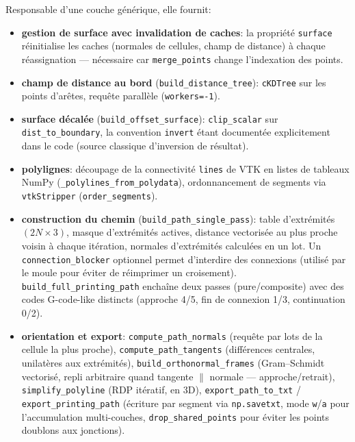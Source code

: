 \documentclass[11pt,a4paper]{article}
\begin{document}
Responsable d'une couche générique, elle fournit:
\begin{itemize}
  \item \textbf{gestion de surface avec invalidation de caches}: la
        propriété \texttt{surface} réinitialise les caches (normales de
        cellules, champ de distance) à chaque réassignation --- nécessaire
        car \texttt{merge\_points} change l'indexation des points.
  \item \textbf{champ de distance au bord}
        (\texttt{build\_distance\_tree}): \texttt{cKDTree} sur les points
        d'arêtes, requête parallèle (\texttt{workers=-1}).
  \item \textbf{surface décalée} (\texttt{build\_offset\_surface}):
        \texttt{clip\_scalar} sur \texttt{dist\_to\_boundary}, la
        convention \texttt{invert} étant documentée explicitement dans
        le code (source classique d'inversion de résultat).
  \item \textbf{polylignes}: découpage de la connectivité \texttt{lines}
        de VTK en listes de tableaux NumPy
        (\texttt{\_polylines\_from\_polydata}), ordonnancement de
        segments via \texttt{vtkStripper} (\texttt{order\_segments}).
  \item \textbf{construction du chemin}
        (\texttt{build\_path\_single\_pass}): table d'extrémités
        $(2N \times 3)$, masque d'extrémités actives, distance
        vectorisée au plus proche voisin à chaque itération, normales
        d'extrémités calculées en un lot. Un \texttt{connection\_blocker}
        optionnel permet d'interdire des connexions (utilisé par le
        moule pour éviter de réimprimer un croisement).
        \texttt{build\_full\_printing\_path} enchaîne deux passes
        (pure/composite) avec des codes G-code-like distincts
        (approche 4/5, fin de connexion 1/3, continuation 0/2).
  \item \textbf{orientation et export}:
        \texttt{compute\_path\_normals} (requête par lots de la cellule
        la plus proche), \texttt{compute\_path\_tangents} (différences
        centrales, unilatères aux extrémités),
        \texttt{build\_orthonormal\_frames} (Gram--Schmidt vectorisé,
        repli arbitraire quand tangente $\parallel$ normale ---
        approche/retrait),
        \texttt{simplify\_polyline} (RDP itératif, en 3D),
        \texttt{export\_path\_to\_txt} / \texttt{export\_printing\_path}
        (écriture par segment via \texttt{np.savetxt}, mode
        \texttt{w}/\texttt{a} pour l'accumulation multi-couches,
        \texttt{drop\_shared\_points} pour éviter les points doublons
        aux jonctions).
\end{itemize}
\end{document}
